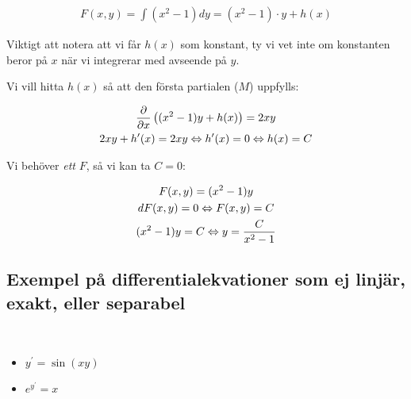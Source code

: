 \begin{equation*}
  \begin{gathered}
    F(x,y)=\int(x^2-1)dy=(x^2-1)\cdot y + h(x)
  \end{gathered}
\end{equation*}
\par\bigskip
\noindent Viktigt att notera att vi får $h(x)$ som konstant, ty vi vet inte om  konstanten beror på $x$ när vi integrerar med avseende på $y$.
\par\bigskip
\noindent Vi vill hitta $h(x)$ så att den första partialen ($M$) uppfylls:
\par\bigskip


\begin{equation*}
  \begin{gathered}
    \dfrac{\partial}{\partial x}\left((x^2-1)y+h(x)\right)=2xy\\
    2xy+h^{\prime}(x)=2xy \Leftrightarrow h^{\prime}(x)=0 \Leftrightarrow h(x)=C
  \end{gathered}
\end{equation*}
\par\bigskip
\noindent Vi behöver \textit{ett} $F$, så vi kan ta $C=0$:

\begin{equation*}
  \begin{gathered}
    F(x,y)=(x^2-1)y\\
    dF(x,y)=0 \Leftrightarrow F(x,y)=C\\
    (x^2-1)y=C \Leftrightarrow y=\dfrac{C}{x^2-1}
  \end{gathered}
\end{equation*}

\subsection{Exempel på differentialekvationer som ej linjär, exakt, eller separabel}\hfill\\

\begin{itemize}
  \item $y^{\prime}=\sin(xy)$
  \item $e^{y^{\prime}}=x$
\end{itemize}





